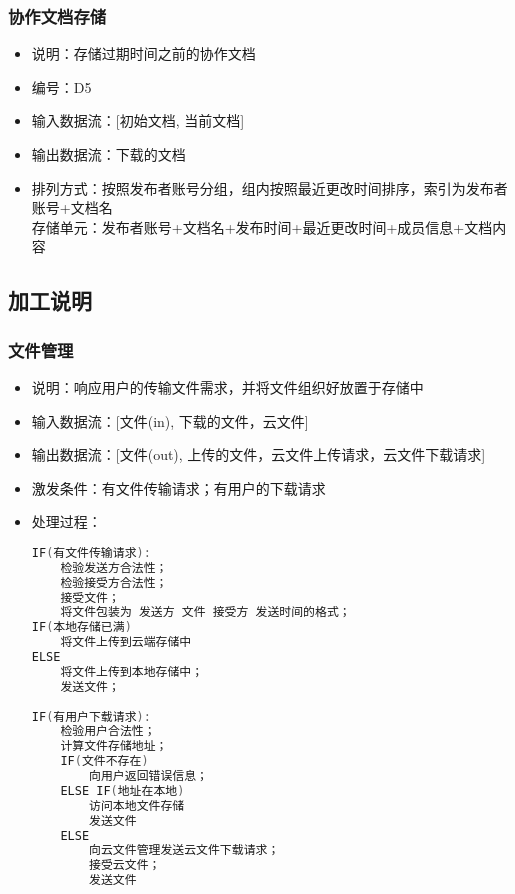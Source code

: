             \subsubsection{协作文档存储}
            \begin{itemize}
                \item 说明：存储过期时间之前的协作文档
                \item 编号：D5
                \item 输入数据流：[初始文档, 当前文档]
                \item 输出数据流：下载的文档
                \item 排列方式：按照发布者账号分组，组内按照最近更改时间排序，索引为发布者账号+文档名\\
                         存储单元：发布者账号+文档名+发布时间+最近更改时间+成员信息+文档内容\\
            \end{itemize}
        \subsection{加工说明}
            \subsubsection{文件管理}
            \begin{itemize}
                \item 说明：响应用户的传输文件需求，并将文件组织好放置于存储中
                \item 输入数据流：[文件(in), 下载的文件，云文件]
                \item 输出数据流：[文件(out), 上传的文件，云文件上传请求，云文件下载请求]
                \item 激发条件：有文件传输请求；有用户的下载请求
                \item 处理过程：
\begin{lstlisting}[language=C, caption=文件管理, label={code:first-code}]
IF(有文件传输请求):
    检验发送方合法性；
    检验接受方合法性；
    接受文件；
    将文件包装为 发送方 文件 接受方 发送时间的格式；
IF(本地存储已满) 
    将文件上传到云端存储中
ELSE 
    将文件上传到本地存储中；
    发送文件；
                
IF(有用户下载请求):
    检验用户合法性；
    计算文件存储地址；
    IF(文件不存在) 
        向用户返回错误信息；
    ELSE IF(地址在本地)
        访问本地文件存储
        发送文件
    ELSE 
        向云文件管理发送云文件下载请求；
        接受云文件；
        发送文件
\end{lstlisting}
            \end{itemize}    
